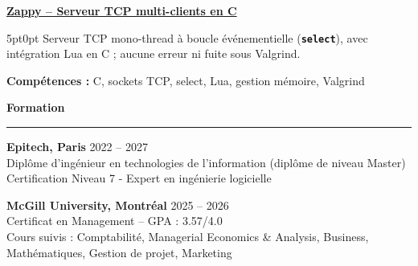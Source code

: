 \documentclass[9pt]{extarticle}
\begin{document}
\par\vspace{8pt}

\underline{\bfseries Zappy -- Serveur TCP multi-clients en C}
\par
\begin{adjustwidth}{5pt}{0pt}
    Serveur TCP mono-thread à boucle événementielle ({\bfseries \texttt{select}}), avec intégration Lua en C ; aucune erreur ni fuite sous Valgrind.
\end{adjustwidth}
\par
{\bfseries Compétences :} C, sockets TCP, select, Lua, gestion mémoire, Valgrind

\par\vspace{8pt}

{\large\bfseries Formation}
\par\vspace{-8pt}
\rule{\linewidth}{0.4pt}
\par\vspace{5pt}

{\bfseries Epitech, Paris} \hfill 2022 -- 2027 \\
Diplôme d'ingénieur en technologies de l'information (diplôme de niveau Master) \\
Certification Niveau 7 - Expert en ingénierie logicielle

\vspace{6pt}

{\bfseries McGill University, Montréal} \hfill 2025 -- 2026 \\
Certificat en Management -- GPA : 3.57/4.0 \\
Cours suivis : Comptabilité, Managerial Economics \& Analysis, Business, Mathématiques, Gestion de projet, Marketing
\end{document}
